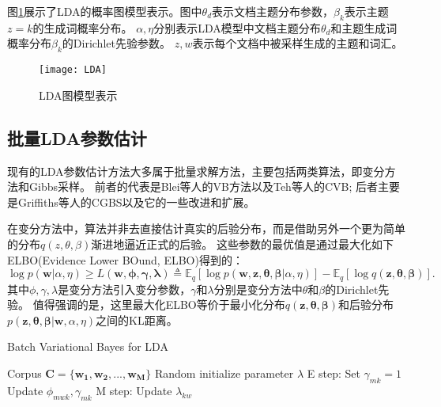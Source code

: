 图\ref{fig:LDA}展示了LDA的概率图模型表示。图中$\theta_d$表示文档主题分布参数，$\beta_k$表示主题$z=k$的生成词概率分布。
$\alpha, \eta$分别表示LDA模型中文档主题分布$\theta_d$和主题生成词概率分布$\beta_k$的Dirichlet先验参数。
$z, w$表示每个文档中被采样生成的主题和词汇。

\begin{figure}[htb]\centering
  \texttt{[image: LDA]}
  \caption{LDA图模型表示}
  \label{fig:LDA}       %
\end{figure}

\subsection{批量LDA参数估计}
现有的LDA参数估计方法大多属于批量求解方法，主要包括两类算法，即变分方法和Gibbs采样。
前者的代表是Blei等人的VB方法\cite{blei2003latent}以及Teh等人的CVB\cite{teh2006a};
后者主要是Griffiths等人的CGBS\cite{griffiths2004finding}以及它的一些改进和扩展\cite{porteous2008fast, yao2009efficient, li2014reducing}。

在变分方法中，算法并非去直接估计真实的后验分布，而是借助另外一个更为简单的分布$q(z,\theta, \beta)$渐进地逼近正式的后验。
这些参数的最优值是通过最大化如下ELBO(Evidence Lower BOund, ELBO)得到的：
\begin{equation}
\log p(\mathbf{w} | \alpha, \eta) \ge L(\mathbf{w, \phi, \gamma, \lambda}) \triangleq 
\mathbb{E}_q{[\log p(\mathbf{w, z, \theta, \beta} | \alpha, \eta)]} - 
\mathbb{E}_q{[\log q(\mathbf{z, \theta, \beta})]}.
\end{equation}
其中$\phi, \gamma, \lambda$是变分方法引入变分参数，$\gamma$和$\lambda$分别是变分方法中$\theta$和$\beta$的Dirichlet先验。
值得强调的是，这里最大化ELBO等价于最小化分布$q(\mathbf{z, \theta, \beta})$和后验分布$p(\mathbf{z, \theta, \beta} | \mathbf{w}, \alpha, \eta)$之间的KL距离。

\begin{algorithm}[htb]  
\caption{ Batch Variational Bayes for LDA} 
\label{alg:bvb} 
\begin{algorithmic}[1] 
\Require Corpus $\mathbf{C = \{w_1, w_2, ..., w_M\}}$
\State Random initialize parameter $\lambda$
\State E step:
\State Set $\gamma_{mk} = 1$
\Repeat
\State Update $\phi_{mwk}, \gamma_{mk} $
\EndFor
\State M step:
\State Update $\lambda_{kw}$
\EndWhile
\end{algorithmic}  
\end{algorithm}  

